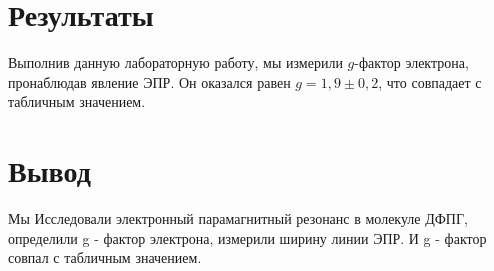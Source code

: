 \documentclass[14pt, a4paper]{extarticle}
\begin{document}
\section{Результаты} %
\label{sec:результаты}
Выполнив данную лабораторную работу, мы измерили $g$-фактор электрона,
пронаблюдав явление ЭПР. Он оказался равен $g = 1,9 \pm 0,2$, что совпадает с табличным значением.
\section{Вывод} %
\label{sec:вывод}
Мы Исследовали электронный парамагнитный резонанс в молекуле ДФПГ, определили g - фактор электрона, измерили ширину линии ЭПР. И g - фактор совпал с табличным значением.
\end{document}

